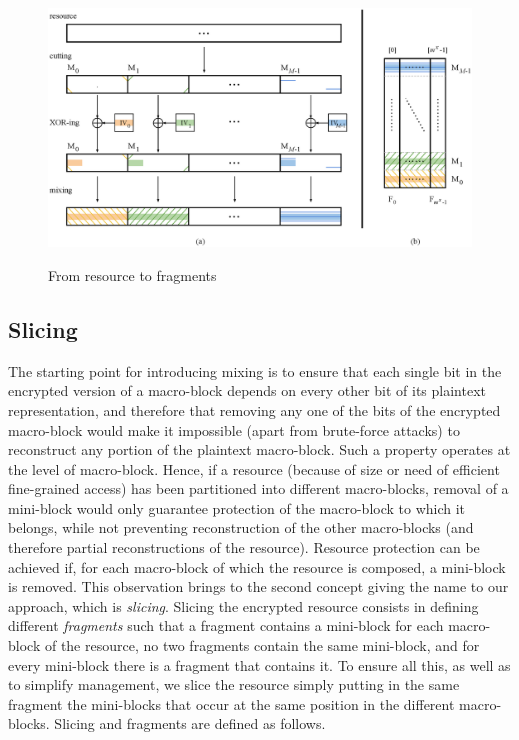 \begin{figure}[!t]
\centering
{\includegraphics[width=\columnwidth]{figures/fig04}}
\caption{\label{ms:fig:mixslice} From resource to fragments}
\end{figure}

\subsection{Slicing}

The starting point for introducing mixing is to ensure that each single bit in the encrypted version of a macro-block depends on every other bit of its plaintext representation, and therefore that removing any one of the bits of the encrypted macro-block would make it impossible (apart from brute-force attacks) to reconstruct any portion of the plaintext macro-block. Such a property operates at the level of macro-block. Hence, if a resource (because of size or need of efficient fine-grained access) has been partitioned into different macro-blocks, removal of a mini-block would only guarantee protection of the macro-block to which it belongs, while not preventing reconstruction of the other macro-blocks (and therefore partial reconstructions of the resource). Resource protection can be achieved if, for each macro-block of which the resource is composed, a mini-block is removed. This observation brings to the second concept giving the name to our approach, which is {\em slicing}. Slicing the encrypted resource consists in defining different {\em fragments} such that a fragment contains a mini-block for each macro-block of the resource, no two fragments contain the same mini-block, and for every mini-block there is a fragment that contains it. To ensure all this, as well as to simplify management, we slice the resource simply putting in the same fragment the mini-blocks that occur at the same position in the different macro-blocks. Slicing and fragments are defined as follows.

